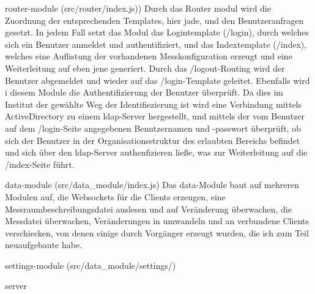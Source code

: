 router-module (src/router/index.js))
Durch das Router modul wird die Zuordnung der entsprechenden Templates, hier jade, und den Benutzeranfragen gesetzt. In jedem Fall setzt das Modul das Logintemplate (/login), durch welches sich ein Benutzer anmeldet und authentifiziert, und das Indextemplate (/index), welches eine Auflistung der vorhandenen Messkonfiguration erzeugt und eine Weiterleitung auf eben jene generiert.
Durch das /logout-Routing wird der Benutzer abgemeldet und wieder auf das /login-Template geleitet.
Ebenfalls wird i diesem Module die Authentifizierung der Benutzer überprüft. Da dies im Institut der gewählte Weg der Identifiezierung ist wird eine Verbindung mittels ActiveDirectory zu einem ldap-Server hergestellt, und mittels der vom Benutzer auf dem /login-Seite angegebenen Benutzernamen und -passwort überprüft, ob sich der Benutzer in der Organisationsstruktur des erlaubten Bereichs befindet und sich über den ldap-Server authenfizieren ließe, was zur Weiterleitung auf die /index-Seite führt.

data-module (src/data_module/index.js)
Das data-Module baut auf mehreren Modulen auf, die Websockets für die Clients erzeugen, eine Messraumbeschreibungsdatei auslesen und auf Veränderung überwachen, die Messdatei überwachen, Veränderungen in umwandeln und an verbundene Clients verschiecken, von denen einige durch Vorgänger erzeugt wurden, die ich zum Teil neuaufgebaute habe.

	settings-module (src/data_module/settings/)


server
